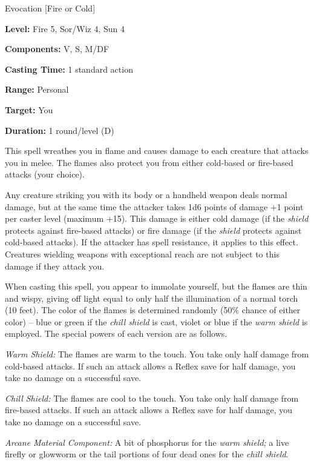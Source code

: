 
Evocation [Fire or Cold]

\textbf{Level:} Fire 5, Sor/Wiz 4, Sun 4

\textbf{Components:} V, S, M/DF

\textbf{Casting Time:} 1 standard action

\textbf{Range:} Personal

\textbf{Target:} You

\textbf{Duration:} 1 round/level (D)

This spell wreathes you in flame and causes damage to each creature that attacks 
you in melee. The flames also protect you from either cold-based or fire-based 
attacks (your choice).

Any creature striking you with its body or a handheld weapon deals normal damage, 
but at the same time the attacker takes 1d6 points of damage +1 point per caster 
level (maximum +15). This damage is either cold damage (if the \textit{shield} protects 
against fire-based attacks) or fire damage (if the \textit{shield} protects against 
cold-based attacks). If the attacker has spell resistance, it applies to this effect. 
Creatures wielding weapons with exceptional reach are not subject to this damage 
if they attack you.

When casting this spell, you appear to immolate yourself, but the flames are thin 
and wispy, giving off light equal to only half the illumination of a normal torch 
(10 feet). The color of the flames is determined randomly (50\% chance of either 
color) -- blue or green if the \textit{chill shield} is cast, violet or blue if 
the \textit{warm shield} is employed. The special powers of each version are as 
follows.

\textit{Warm Shield:} The flames are warm to the touch. You take only half damage 
from cold-based attacks. If such an attack allows a Reflex save for half damage, 
you take no damage on a successful save.

\textit{Chill Shield:} The flames are cool to the touch. You take only half damage 
from fire-based attacks. If such an attack allows a Reflex save for half damage, 
you take no damage on a successful save.

\textit{Arcane Material Component:} A bit of phosphorus for the \textit{warm shield; 
}a live firefly or glowworm or the tail portions of four dead ones for the \textit{chill 
shield}.

